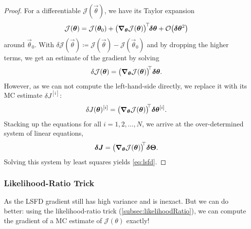 				\begin{proof}
					For a differentiable \(\mathcal{J}(\vec{\theta})\), we have its Taylor expansion
					\begin{equation}
						\mathcal{J}(\bm{\theta}) = \mathcal{J}(\bm{\theta}_0) + \bigl( \grad_{\bm{\theta}} \mathcal{J}(\bm{\theta}) \bigr)^{\!\top\!} \bm{\delta\theta} + \mathcal{O}\bigl( \bm{\delta\theta}^2 \bigr)
					\end{equation}
					around \(\vec{\theta}_0\). With \( \delta\mathcal{J}(\vec{\theta}) \coloneqq \mathcal{J}(\vec{\theta}) - \mathcal{J}(\vec{\theta}_0) \) and by dropping the higher terms, we get an estimate of the gradient by solving
					\begin{equation}
						\delta\mathcal{J}(\bm{\theta}) = \bigl( \grad_{\bm{\theta}}\mathcal{J}(\bm{\theta}) \bigr)^{\!{\!\top\!}\,} \bm{\delta\theta}.
					\end{equation}
					However, as we can not compute the left-hand-side directly, we replace it with its \ac{MC} estimate \( {\delta J}^{[i]} \):
					\begin{equation}
						{\delta J}(\bm{\theta})^{[i]} = \bigl( \grad_{\bm{\theta}}\mathcal{J}(\bm{\theta}) \bigr)^{\!{\!\top\!}\,} \bm{\delta\theta}^{[i]}.
					\end{equation}
					Stacking up the equations for all \( i = 1, 2, \dots, N \), we arrive at the over-determined system of linear equations,
					\begin{equation}
						\bm{\delta J} = \bigl( \grad_{\bm{\theta}}\mathcal{J}(\bm{\theta}) \bigr)^{\!{\!\top\!}\,} \bm{\delta\Theta}.
					\end{equation}
					Solving this system by least squares yields \eqref{eq:lsfd}.
				\end{proof}

			\subsubsection{Likelihood-Ratio Trick}
				As the \ac{LSFD} gradient still has high variance and is inexact. But we can do better: using the likelihood-ratio trick (\autoref{subsec:likelihoodRatio}), we can compute the gradient of a \ac{MC} estimate of \(\mathcal{J}(\theta)\) exactly!

